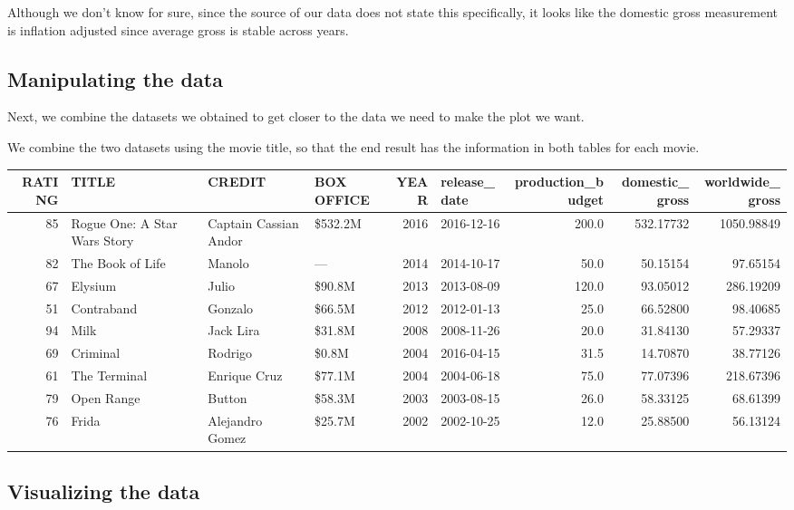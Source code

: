 \documentclass[]{article}
\theoremstyle{definition}
\theoremstyle{definition}
\theoremstyle{remark}
\begin{document}
Although we don't know for sure, since the source of our data does not
state this specifically, it looks like the domestic gross measurement is
inflation adjusted since average gross is stable across years.

\subsection{Manipulating the data}\label{manipulating-the-data}

Next, we combine the datasets we obtained to get closer to the data we
need to make the plot we want.

We combine the two datasets using the movie title, so that the end
result has the information in both tables for each movie.

\begin{tabular}{r|l|l|l|r|l|r|r|r}
\hline
RATING & TITLE & CREDIT & BOX OFFICE & YEAR & release\_date & production\_budget & domestic\_gross & worldwide\_gross\\
\hline
85 & Rogue One: A Star Wars Story & Captain Cassian Andor & \$532.2M & 2016 & 2016-12-16 & 200.0 & 532.17732 & 1050.98849\\
\hline
82 & The Book of Life & Manolo & — & 2014 & 2014-10-17 & 50.0 & 50.15154 & 97.65154\\
\hline
67 & Elysium & Julio & \$90.8M & 2013 & 2013-08-09 & 120.0 & 93.05012 & 286.19209\\
\hline
51 & Contraband & Gonzalo & \$66.5M & 2012 & 2012-01-13 & 25.0 & 66.52800 & 98.40685\\
\hline
94 & Milk & Jack Lira & \$31.8M & 2008 & 2008-11-26 & 20.0 & 31.84130 & 57.29337\\
\hline
69 & Criminal & Rodrigo & \$0.8M & 2004 & 2016-04-15 & 31.5 & 14.70870 & 38.77126\\
\hline
61 & The Terminal & Enrique Cruz & \$77.1M & 2004 & 2004-06-18 & 75.0 & 77.07396 & 218.67396\\
\hline
79 & Open Range & Button & \$58.3M & 2003 & 2003-08-15 & 26.0 & 58.33125 & 68.61399\\
\hline
76 & Frida & Alejandro Gomez & \$25.7M & 2002 & 2002-10-25 & 12.0 & 25.88500 & 56.13124\\
\hline
\end{tabular}

\subsection{Visualizing the data}\label{visualizing-the-data}
\end{document}
